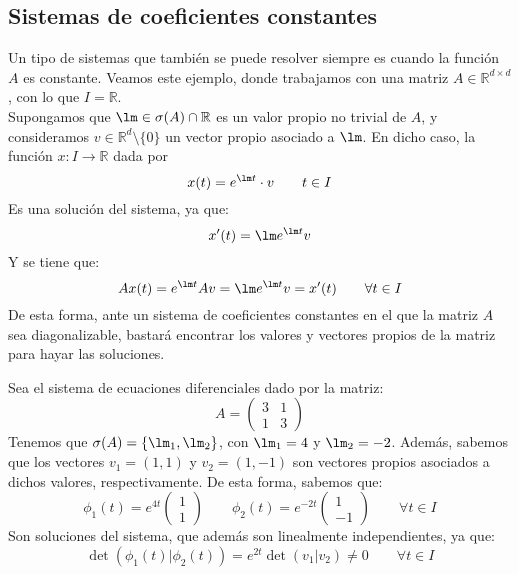 \subsection{Sistemas de coeficientes constantes}\label{sec:sel_coef_ctes}
\noindent
Un tipo de sistemas que también se puede resolver siempre es cuando la función $A$ es constante. Veamos este ejemplo, donde trabajamos con una matriz $A\in \mathbb{R}^{d\times d}$, con lo que $I=\mathbb{R}$.\\

Supongamos que $\lm \in \sigma(A)\cap \mathbb{R}$ es un valor propio no trivial de $A$, y consideramos $v\in \mathbb{R}^d\setminus\{0\}$ un vector propio asociado a $\lm$. En dicho caso, la función $x:I\rightarrow\mathbb{R}$ dada por
\begin{equation*}
    x(t) = e^{\lm t} \cdot v \qquad t\in I
\end{equation*}
Es una solución del sistema, ya que:
\begin{equation*}
    x'(t) = \lm e^{\lm t} v 
\end{equation*}
Y se tiene que:
\begin{equation*}
    Ax(t) = e^{\lm t} Av = \lm e^{\lm t} v = x'(t) \qquad \forall t\in I
\end{equation*}
De esta forma, ante un sistema de coeficientes constantes en el que la matriz $A$ sea diagonalizable, bastará encontrar los valores y vectores propios de la matriz para hayar las soluciones.

\begin{ejemplo}
    Sea el sistema de ecuaciones diferenciales dado por la matriz:
    \begin{equation*}
        A = \left(\begin{array}{cc}
                3 & 1 \\
                1 & 3
        \end{array}\right)
    \end{equation*}
    Tenemos que $\sigma(A) = \{\lm_1, \lm_2\}$, con $\lm_1 = 4$ y $\lm_2 = -2$. Además, sabemos que los vectores $v_1=(1, 1)$ y $v_2 = (1, -1)$ son vectores propios asociados a dichos valores, respectivamente. De esta forma, sabemos que:
    \begin{equation*}
        \phi_1(t) = e^{4t} \left(\begin{array}{c}
            1 \\
            1
        \end{array}\right) \qquad 
        \phi_2(t) = e^{-2t} \left(\begin{array}{c}
            1 \\
            -1
        \end{array}\right) \qquad \forall t\in I
    \end{equation*}
    Son soluciones del sistema, que además son linealmente independientes, ya que:
    \begin{equation*}
        \det(\phi_1(t)|\phi_2(t)) = e^{2t} \det(v_1|v_2) \neq 0 \qquad \forall t\in I
    \end{equation*}
\end{ejemplo}

